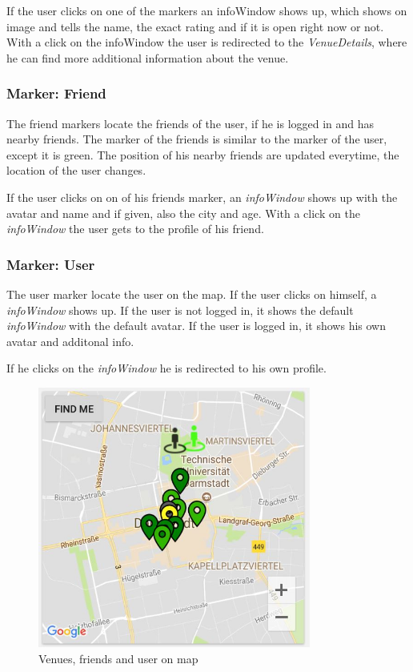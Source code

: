 If the user clicks on one of the markers an infoWindow shows up, which shows on image and tells the name, the exact rating and if it is open right now or not. With a click on the infoWindow the user is redirected to the \textit{VenueDetails}, where he can find more additional information about the venue.

\subsubsection{Marker: Friend}
The friend markers locate the friends of the user, if he is logged in and has nearby friends. The marker of the friends is similar to the marker of the user, except it is green.
The position of his nearby friends are updated everytime, the location of the user changes. 

If the user clicks on on of his friends marker, an \textit{infoWindow} shows up with the avatar and name and if given, also the city and age. With a click on the \textit{infoWindow} the user gets to the profile of his friend.

\subsubsection{Marker: User}
The user marker locate the user on the map. If the user clicks on himself, a \textit{infoWindow} shows up. If the user is not logged in, it shows the default \textit{infoWindow} with the default avatar. If the user is logged in, it shows his own avatar and additonal info. 

If he clicks on the \textit{infoWindow} he is redirected to his own profile.

\begin{figure}[htbp]
 	\includegraphics[width=0.8\textwidth]{images/venuesonmap.jpg}
 	\centering
 	\caption[]{Venues, friends and user on map}
 	\label{fig:venuesonmap}
\end{figure}



